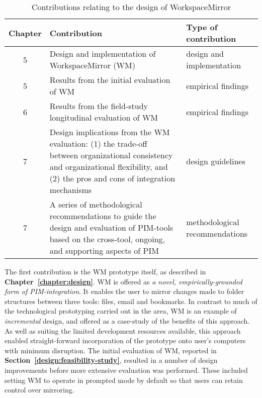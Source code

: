 \begin{table}[hbtp]
\begin{center}
\begin{footnotesize}
\setlength{\extrarowheight}{2pt}
\begin{tabular}{|c|p{9cm}|p{3cm}|}
\hline
{\bf Chapter} & {\bf Contribution} & {\bf Type of contribution} \\
\hline
         5 & Design and implementation of WorkspaceMirror (WM) & design and implementation \\
\hline
         5 & Results from the initial evaluation of WM & empirical findings \\
\hline
         6 & Results from the field-study longitudinal evaluation of WM & empirical findings \\
\hline
      7 & Design implications from the WM evaluation: (1) the trade-off between organizational consistency and organizational flexibility, and (2) the pros and cons of integration mechanisms & design guidelines \\
\hline
         7 & A series of methodological recommendations to guide the design and evaluation of PIM-tools based on the cross-tool, ongoing, and supporting aspects of PIM & methodological recommendations \\
\hline
\end{tabular}  
\end{footnotesize}
\caption{Contributions relating to the design of WorkspaceMirror}
\label{table:conclusion:contributions:design}
\end{center}
\end{table}
\normalsize

The first contribution is the WM prototype itself, as described in \textbf{Chapter~\ref{chapter:design}}. WM is offered as \textit{a novel, empirically-grounded form of PIM-integration}.  It enables the user to mirror changes made to folder structures between three tools: files, email and bookmarks.  In contrast to much of the technological prototyping carried out in the area, WM is an example of \textit{incremental} design, and offered as a case-study of the benefits of this approach.  As well as suiting the limited development resources available, this approach enabled straight-forward incorporation of the prototype onto user's computers with minimum disruption.  %
The initial evaluation of WM, reported in \textbf{Section~\ref{design:feasibility-study}}, resulted in a number of design improvements before more extensive evaluation was performed. These included setting WM to operate in prompted mode by default so that users can retain control over mirroring.


